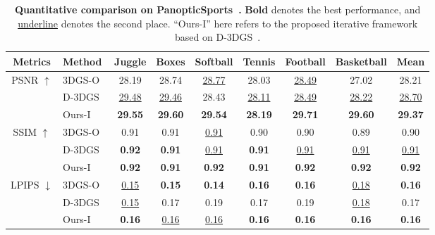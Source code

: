 \documentclass[runningheads]{llncs}
\begin{document}
\begin{table}[t]
  \centering
  \caption{\textbf{Quantitative comparison on PanopticSports~\cite{d3dgs}.}
  \textbf{Bold} denotes the best performance, and \underline{underline} denotes the second place.
  ``Ours-I'' here refers to the proposed iterative framework based on D-3DGS~\cite{d3dgs}.
  }
    \begin{tabular}{c|l|ccccccc}
    \toprule
    Metrics & Method & Juggle & Boxes & Softball & Tennis & Football & Basketball & Mean \\
    \midrule
    \multirow{3}[0]{*}{PSNR $\uparrow$}
          & 3DGS-O~\cite{d3dgs} & 28.19  & 28.74  & \underline{28.77}  & 28.03  & \underline{28.49}  & 27.02  & 28.21  \\
          & D-3DGS~\cite{d3dgs} & \underline{29.48}  & \underline{29.46}  & 28.43  & \underline{28.11}  & \underline{28.49}  & \underline{28.22}  & \underline{28.70}  \\
          & Ours-I  & \textbf{29.55} & \textbf{29.60} & \textbf{29.54} & \textbf{28.19} & \textbf{29.71} & \textbf{29.60} & \textbf{29.37} \\
    \midrule
    \multirow{3}[0]{*}{SSIM $\uparrow$}
          & 3DGS-O~\cite{d3dgs} & 0.91  & 0.91  & \underline{0.91}  & 0.90  & 0.90  & 0.89  & 0.90  \\
          & D-3DGS~\cite{d3dgs} & \textbf{0.92} & \textbf{0.91} & \underline{0.91}  & \textbf{0.91} & \underline{0.91}  & \underline{0.91}  & \underline{0.91} \\
          & Ours-I  & \textbf{0.92} & \textbf{0.91} & \textbf{0.92} & \textbf{0.91} & \textbf{0.92} & \textbf{0.92} & \textbf{0.92} \\
    \midrule
    \multirow{3}[0]{*}{LPIPS $\downarrow$}
          & 3DGS-O~\cite{d3dgs} & \underline{0.15} & \textbf{0.15} & \textbf{0.14} & \textbf{0.16} & \textbf{0.16} & \underline{0.18}  & \textbf{0.16} \\
          & D-3DGS~\cite{d3dgs} & \underline{0.15} & 0.17  & 0.19  & 0.17  & 0.19  & \underline{0.18}  & 0.17  \\
          & Ours-I  & \textbf{0.16} & \underline{0.16}  & \underline{0.16}  & \textbf{0.16} & \textbf{0.16} & \textbf{0.16} & \textbf{0.16} \\
    \bottomrule
    \end{tabular}%
  \label{tab:sports}%
\end{table}%
\end{document}
